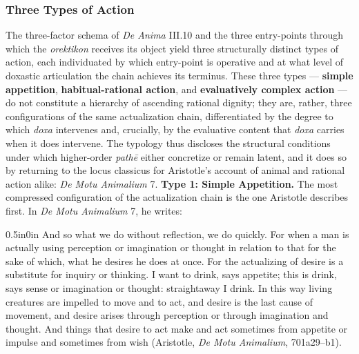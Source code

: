 \documentclass{article}
\begin{document}
\subsubsection*{Three Types of Action} The three-factor schema of \textit{De Anima} III.10 and the three entry-points through which the \textit{orektikon} receives its object yield three structurally distinct types of action, each individuated by which entry-point is operative and at what level of doxastic articulation the chain achieves its terminus. These three types --- \textbf{simple appetition}, \textbf{habitual-rational action}, and \textbf{evaluatively complex action} --- do not constitute a hierarchy of ascending rational dignity; they are, rather, three configurations of the same actualization chain, differentiated by the degree to which \textit{doxa} intervenes and, crucially, by the evaluative content that \textit{doxa} carries when it does intervene. The typology thus discloses the structural conditions under which higher-order \textit{path\=e} either concretize or remain latent, and it does so by returning to the locus classicus for Aristotle's account of animal and rational action alike: \textit{De Motu Animalium} 7. \textbf{Type 1: Simple Appetition.} The most compressed configuration of the actualization chain is the one Aristotle describes first. In \textit{De Motu Animalium} 7, he writes: \begin{adjustwidth}{0.5in}{0in}
And so what we do without reflection, we do quickly. For when a man is actually using perception or imagination or thought in relation to that for the sake of which, what he desires he does at once. For the actualizing of desire is a substitute for inquiry or thinking. I want to drink, says appetite; this is drink, says sense or imagination or thought: straightaway I drink. In this way living creatures are impelled to move and to act, and desire is the last cause of movement, and desire arises through perception or through imagination and thought. And things that desire to act make and act sometimes from appetite or impulse and sometimes from wish (Aristotle, \textit{De Motu Animalium}, 701a29--b1).

\end{adjustwidth}
\end{document}
